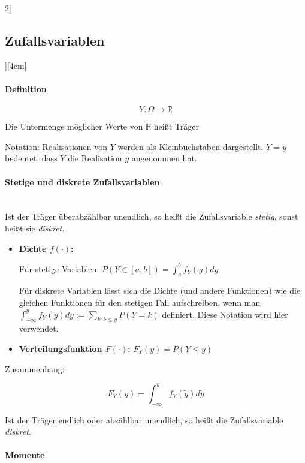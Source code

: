 \documentclass[8pt]{extarticle}
\begin{document}
\begin{multicols}{2}[\subsection{Zufallsvariablen}][4cm]

\paragraph{Definition}

$$Y: \Omega \to \mathbb{R}$$

\noindent Die Untermenge möglicher Werte von $\mathbb{R}$ heißt Träger

\noindent Notation: Realisationen von $Y$ werden als Kleinbuchstaben dargestellt. $Y=y$ bedeutet, dass $Y$ die Realisation $y$ angenommen hat.

\paragraph{Stetige und diskrete Zufallsvariablen} \ \\

\noindent Ist der Träger überabzählbar unendlich, so heißt die Zufallsvariable \textit{stetig}, sonst heißt sie \textit{diskret}.

\begin{itemize}
\item \textbf{Dichte \boldmath$f(\cdot)$:} 

Für stetige Variablen:
$P(Y \in \left[a, b\right]) = \int_{a}^{b} f_Y(y) dy$

Für diskrete Variablen lässt sich die Dichte (und andere Funktionen) wie die gleichen Funktionen für den stetigen Fall aufschreiben, wenn man 
$\int_{-\infty}^{y} f_Y(\tilde{y})d\tilde{y} := \sum_{k:k \leq y} P(Y=k)$ definiert. Diese Notation wird hier verwendet.

\item \textbf{Verteilungsfunktion \boldmath$F(\cdot)$:} 
$F_Y(y) =P(Y\leq y)$
\end{itemize}

Zusammenhang:

$$F_Y(y) = \int_{-\infty}^{y} f_Y(\tilde{y})d\tilde{y}$$

\noindent Ist der Träger endlich oder abzählbar unendlich, so heißt die Zufallsvariable \textit{diskret}.

\paragraph{Momente}


\end{multicols}
\end{document}
